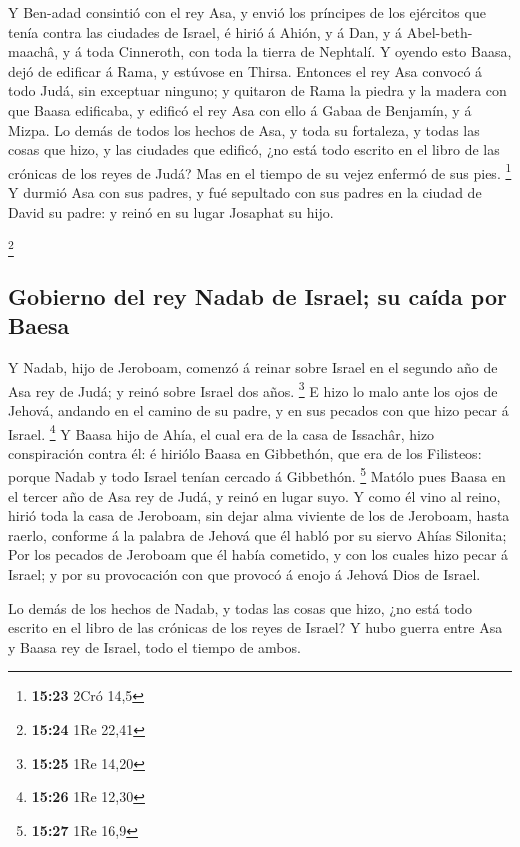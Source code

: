  Y Ben-adad consintió con el rey Asa, y envió los príncipes
de los ejércitos que tenía contra las ciudades de Israel, é hirió á
Ahión, y á Dan, y á Abel-beth-maachâ, y á toda Cinneroth, con toda la
tierra de Nephtalí.  Y oyendo esto Baasa, dejó de edificar
á Rama, y estúvose en Thirsa.  Entonces el rey Asa convocó
á todo Judá, sin exceptuar ninguno; y quitaron de Rama la piedra y la
madera con que Baasa edificaba, y edificó el rey Asa con ello á Gabaa de
Benjamín, y á Mizpa.  Lo demás de todos los hechos de Asa,
y toda su fortaleza, y todas las cosas que hizo, y las ciudades que
edificó, ¿no está todo escrito en el libro de las crónicas de los reyes
de Judá? Mas en el tiempo de su vejez enfermó de sus pies. \footnote{\textbf{15:23}
  2Cró 14,5}  Y durmió Asa con sus padres, y fué sepultado
con sus padres en la ciudad de David su padre: y reinó en su lugar
Josaphat su hijo.

\footnote{\textbf{15:24} 1Re 22,41}

\hypertarget{gobierno-del-rey-nadab-de-israel-su-cauxedda-por-baesa}{%
\subsection{Gobierno del rey Nadab de Israel; su caída por
Baesa}\label{gobierno-del-rey-nadab-de-israel-su-cauxedda-por-baesa}}

 Y Nadab, hijo de Jeroboam, comenzó á reinar sobre Israel
en el segundo año de Asa rey de Judá; y reinó sobre Israel dos años.
\footnote{\textbf{15:25} 1Re 14,20}  E hizo lo malo ante
los ojos de Jehová, andando en el camino de su padre, y en sus pecados
con que hizo pecar á Israel. \footnote{\textbf{15:26} 1Re 12,30}
 Y Baasa hijo de Ahía, el cual era de la casa de Issachâr,
hizo conspiración contra él: é hiriólo Baasa en Gibbethón, que era de
los Filisteos: porque Nadab y todo Israel tenían cercado á Gibbethón.
\footnote{\textbf{15:27} 1Re 16,9}  Matólo pues Baasa en el
tercer año de Asa rey de Judá, y reinó en lugar suyo.  Y
como él vino al reino, hirió toda la casa de Jeroboam, sin dejar alma
viviente de los de Jeroboam, hasta raerlo, conforme á la palabra de
Jehová que él habló por su siervo Ahías Silonita;  Por los
pecados de Jeroboam que él había cometido, y con los cuales hizo pecar á
Israel; y por su provocación con que provocó á enojo á Jehová Dios de
Israel.

 Lo demás de los hechos de Nadab, y todas las cosas que
hizo, ¿no está todo escrito en el libro de las crónicas de los reyes de
Israel?  Y hubo guerra entre Asa y Baasa rey de Israel,
todo el tiempo de ambos.

